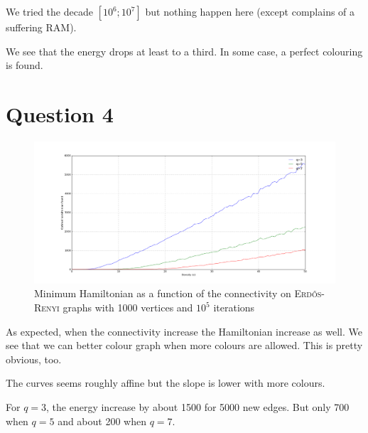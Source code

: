 \documentclass[a4paper, 11pt]{article}
\begin{document}
We tried the decade $[10^6; 10^7]$ but nothing happen here (except complains of a suffering RAM).

We see that the energy drops at least to a third. In some case, a perfect colouring is found.

\FloatBarrier

\section{Question 4}

\begin{figure}[!ht]
	\centering
	\includegraphics[width=\textwidth]{figures/q4}
	\caption{Minimum Hamiltonian as a function of the connectivity on \textsc{Erd\H{o}s-Renyi} graphs with 1000 vertices and $10^5$ iterations}
\end{figure}

As expected, when the connectivity increase the Hamiltonian increase as well. We see that we can better colour graph when more colours are allowed. This is pretty obvious, too.

The curves seems roughly affine but the slope is lower with more colours.

For $q=3$, the energy increase by about 1500 for 5000 new edges. But only 700 when $q=5$ and about 200 when $q=7$.


\FloatBarrier



\end{document}
